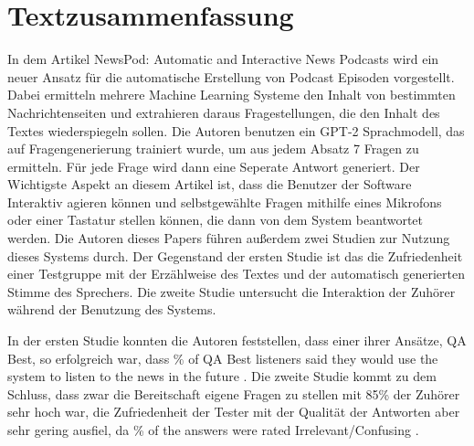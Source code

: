 \thispagestyle{empty}
\chapter{Textzusammenfassung}\label{ch:summary}

In dem Artikel \glqq NewsPod: Automatic and Interactive News Podcasts\grqq{} \cite{laban2022} wird ein neuer Ansatz für die automatische Erstellung von Podcast Episoden vorgestellt. 
Dabei ermitteln mehrere Machine Learning Systeme den Inhalt von bestimmten Nachrichtenseiten und extrahieren daraus Fragestellungen, die den Inhalt des Textes wiederspiegeln sollen. Die Autoren benutzen ein GPT-2 Sprachmodell, das auf Fragengenerierung trainiert wurde, um aus jedem Absatz 7 Fragen zu ermitteln. 
Für jede Frage wird dann eine Seperate Antwort generiert. 
Der Wichtigste Aspekt an diesem Artikel ist, dass die Benutzer der Software Interaktiv agieren können und selbstgewählte Fragen mithilfe eines Mikrofons oder einer Tastatur stellen können, die dann von dem System beantwortet werden. 
Die Autoren dieses Papers führen außerdem zwei Studien zur Nutzung dieses Systems durch.
Der Gegenstand der ersten Studie ist das die Zufriedenheit einer Testgruppe mit der Erzählweise des Textes und der automatisch generierten Stimme des Sprechers. 
Die zweite Studie untersucht die Interaktion der Zuhörer während der Benutzung des Systems. 
\cite{laban2022}

In der ersten Studie konnten die Autoren feststellen, dass einer ihrer Ansätze, QA Best,  so erfolgreich war, dass \% of QA Best listeners said they would use the system to listen to the news in the future\grqq{}  \cite{laban2022}.
Die zweite Studie kommt zu dem Schluss, dass zwar die Bereitschaft eigene Fragen zu stellen mit 85\% der Zuhörer sehr hoch war, die Zufriedenheit der Tester mit der Qualität der Antworten aber sehr gering ausfiel, da \% of the answers were rated Irrelevant/Confusing\grqq{} \cite{laban2022}.





